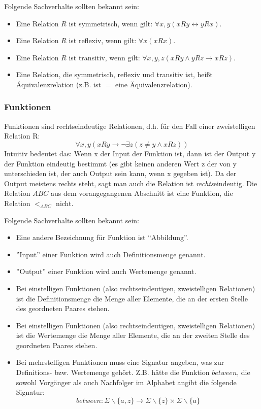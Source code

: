 \noindent
Folgende Sachverhalte sollten bekannt sein:
\begin{itemize}
    \item Eine Relation $R$ ist symmetrisch, wenn gilt: $\forall x,y(xRy \leftrightarrow yRx)$.
    \item Eine Relation $R$ ist reflexiv, wenn gilt: $\forall x(xRx)$.
    \item Eine Relation $R$ ist transitiv,
        wenn gilt: $\forall x,y,z(xRy \wedge yRz \rightarrow xRz)$.
    \item Eine Relation, die symmetrisch, reflexiv und transitiv ist,
          heißt Äquivalenzrelation (z.B. ist $=$ eine Äquivalenzrelation).
\end{itemize}

\subsubsection{Funktionen}
Funktionen sind rechtseindeutige Relationen,
d.h. für den Fall einer zweistelligen Relation R:
\[
    \forall x,y (xRy \rightarrow \neg \exists z (z \neq y \wedge xRz))
\]
Intuitiv bedeutet das: Wenn x der Input der Funktion ist,
dann ist der Output y der Funktion eindeutig bestimmt
(es gibt keinen anderen Wert z der von y unterschieden ist,
der auch Output sein kann, wenn x gegeben ist).
Da der Output meistens rechts steht, sagt man auch die Relation ist \emph{rechts}eindeutig.
Die Relation $ABC$ aus dem vorangegangenen Abschnitt ist eine Funktion,
die Relation $<_{ABC}$ nicht.

Folgende Sachverhalte sollten bekannt sein:
\begin{itemize}
    \item Eine andere Bezeichnung für Funktion ist ``Abbildung''.
    \item ''Input'' einer Funktion wird auch Definitionsmenge genannt.
    \item ''Output'' einer Funktion wird auch Wertemenge genannt.
    \item Bei einstelligen Funktionen (also rechtseindeutigen, zweistelligen Relationen)
        ist die Definitionsmenge die Menge aller Elemente,
        die an der ersten Stelle des geordneten Paares stehen.
    \item Bei einstelligen Funktionen (also rechtseindeutigen, zweistelligen Relationen)
        ist die Wertemenge die Menge aller Elemente,
        die an der zweiten Stelle des geordneten Paares stehen.
    \item Bei mehrstelligen Funktionen muss eine Signatur angeben, was zur Definitions-
        bzw. Wertemenge gehört. Z.B. hätte die Funktion $between$,
        die sowohl Vorgänger als auch Nachfolger im Alphabet angibt die folgende Signatur:
        \[ between:
            \Sigma \backslash \{a,z\}
            \rightarrow
            \Sigma \backslash \{z\} \times \Sigma \backslash \{a\} \]
\end{itemize}

